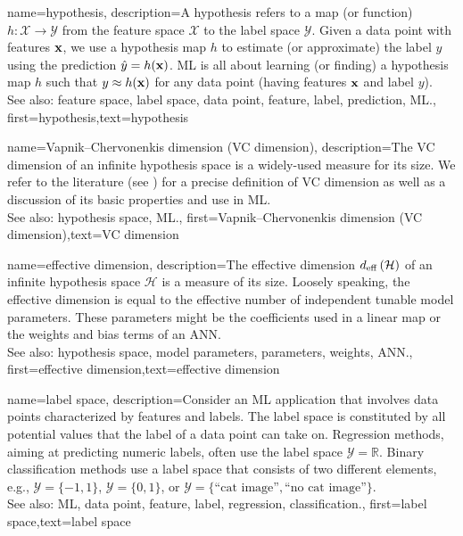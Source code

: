 {name={hypothesis},
	description={A hypothesis refers to a map (or function) $h: \mathcal{X} \rightarrow \mathcal{Y}$ from the 
		feature space $\mathcal{X}$ to the label space $\mathcal{Y}$. 
		Given a data point with features ${\bf x}$, we use a hypothesis map $h$
		to estimate (or approximate) the label $y$ using the prediction  
		$\hat{y} = h({\bf x})$. ML is all about learning (or finding) a 
		hypothesis map $h$ such that $y \approx h({\bf x})$ 
		for any data point (having features ${\bf x}$ and label $y$).
					\\ 
		See also: feature space, label space, data point, feature, label, prediction, ML.},
	first={hypothesis},text={hypothesis}  
}



{name={Vapnik–Chervonenkis dimension (VC dimension)},
	description={The VC dimension of an infinite hypothesis space is a widely-used measure 
		for its size. We refer to the literature (see \cite{ShalevMLBook}) for a precise definition of VC dimension 
		as well as a discussion of its basic properties and use in ML.
					\\ 
		See also: hypothesis space, ML.},
	first={Vapnik–Chervonenkis dimension (VC dimension)},text={VC dimension}  
}

{name={effective dimension},
	description={The effective dimension $d_{\rm eff} \left( \mathcal{H} \right)$ of 
		an infinite hypothesis space $\mathcal{H}$ is a measure of its size. Loosely speaking, the 
		effective dimension is equal to the effective number of independent tunable model parameters. 
		These parameters might be the coefficients used in a linear map or the 
		weights and bias terms of an ANN.
					\\ 
		See also: hypothesis space, model parameters, parameters, weights, ANN.},
	first={effective dimension},text={effective dimension}  
}

{name={label space},
	description={Consider an ML application that involves data points characterized by features 
		and labels. The label space is constituted by all potential values that the label 
		of a data point can take on. Regression methods, aiming at predicting numeric labels, often
		 use the label space $\mathcal{Y} = \mathbb{R}$. Binary classification methods use a label space 
 		that consists of two different elements, e.g., $\mathcal{Y} =\{-1,1\}$, $\mathcal{Y}=\{0,1\}$, 
		or $\mathcal{Y} = \{ \mbox{``cat image''}, \mbox{``no cat image''} \}$.
					\\ 
		See also: ML, data point, feature, label, regression, classification.}, first={label space},text={label space}  
}

